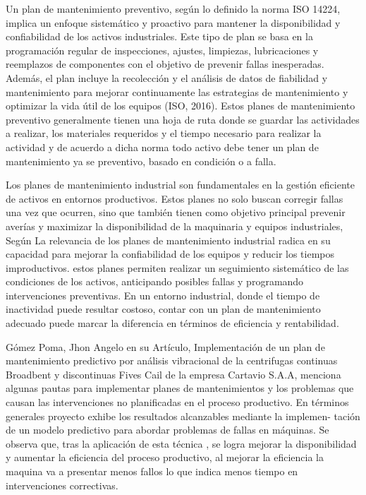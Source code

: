 \documentclass[
  11pt,
  bookmarksnumbered]{article}
\begin{document}
Un plan de mantenimiento preventivo, según lo definido la norma ISO 14224, implica un enfoque sistemático y proactivo para mantener la disponibilidad y confiabilidad de los activos industriales.
Este tipo de plan se basa en la programación regular de inspecciones, ajustes, limpiezas, lubricaciones y reemplazos de componentes con el objetivo de prevenir fallas inesperadas.
Además, el plan incluye la recolección y el análisis de datos de fiabilidad y mantenimiento para mejorar continuamente las estrategias de mantenimiento y optimizar la vida útil de los equipos (ISO, 2016).
Estos planes de mantenimiento preventivo generalmente tienen una hoja de ruta donde se guardar las actividades a realizar, los materiales requeridos y el tiempo necesario para realizar la actividad y de acuerdo a dicha norma todo activo debe tener un plan de mantenimiento ya se preventivo, basado en condición o a falla.

Los planes de mantenimiento industrial son fundamentales en la gestión eficiente de activos en entornos productivos.
Estos planes no solo buscan corregir fallas una vez que ocurren, sino que también tienen como objetivo principal prevenir averías y maximizar la disponibilidad de la maquinaria y equipos industriales, Según \textcite{Martinez2020} La relevancia de los planes de mantenimiento industrial radica en su capacidad para mejorar la confiabilidad de los equipos y reducir los tiempos improductivos.
estos planes permiten realizar un seguimiento sistemático de las condiciones de los activos, anticipando posibles fallas y programando intervenciones preventivas.
En un entorno industrial, donde el tiempo de inactividad puede resultar costoso, contar con un plan de mantenimiento adecuado puede marcar la diferencia en términos de eficiencia y rentabilidad.

Gómez Poma, Jhon Angelo en su Artículo, Implementación de un plan de mantenimiento predictivo por análisis vibracional de la centrifugas continuas Broadbent y discontinuas Fives Cail de la empresa Cartavio S.A.A, menciona algunas pautas para implementar planes de mantenimientos y los problemas que causan las intervenciones no planificadas en el proceso productivo.
En términos generales proyecto exhibe los resultados alcanzables mediante la implemen- tación de un modelo predictivo para abordar problemas de fallas en máquinas.
Se observa que, tras la aplicación de esta técnica \textcite{gomez2022implementacion}, se logra mejorar la disponibilidad y aumentar la eficiencia del proceso productivo, al mejorar la eficiencia la maquina va a presentar menos fallos lo que indica menos tiempo en intervenciones correctivas.
\end{document}
